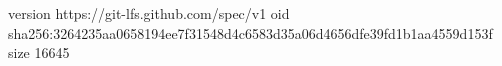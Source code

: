 version https://git-lfs.github.com/spec/v1
oid sha256:3264235aa0658194ee7f31548d4c6583d35a06d4656dfe39fd1b1aa4559d153f
size 16645

